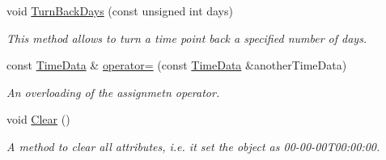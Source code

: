 \begin{DoxyCompactItemize}
void \hyperlink{structTimeData_ad204062485d50c24aad1d4b41a582bd8}{Turn\+Back\+Days} (const unsigned int days)
\begin{DoxyCompactList}\small\item\em This method allows to turn a time point back a specified number of days. \end{DoxyCompactList}\item 
\mbox{\label{structTimeData_a43ba78733adf4369e4c8c89db1819772}} 
const \hyperlink{structTimeData}{Time\+Data} \& \hyperlink{structTimeData_a43ba78733adf4369e4c8c89db1819772}{operator=} (const \hyperlink{structTimeData}{Time\+Data} \&another\+Time\+Data)
\begin{DoxyCompactList}\small\item\em An overloading of the assignmetn operator. \end{DoxyCompactList}\item 
\mbox{\label{structTimeData_af1071330f0fadc98a5e08d41a8436907}} 
void \hyperlink{structTimeData_af1071330f0fadc98a5e08d41a8436907}{Clear} ()
\begin{DoxyCompactList}\small\item\em A method to clear all attributes, i.\+e. it set the object as 00-\/00-\/00\+T00\+:00\+:00. \end{DoxyCompactList}\end{DoxyCompactItemize}
